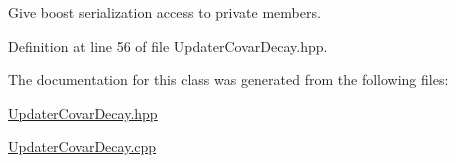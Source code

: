 Give boost serialization access to private members. 



Definition at line 56 of file Updater\+Covar\+Decay.\+hpp.



The documentation for this class was generated from the following files\+:\begin{DoxyCompactItemize}
\item 
\hyperlink{UpdaterCovarDecay_8hpp}{Updater\+Covar\+Decay.\+hpp}\item 
\hyperlink{UpdaterCovarDecay_8cpp}{Updater\+Covar\+Decay.\+cpp}\end{DoxyCompactItemize}
